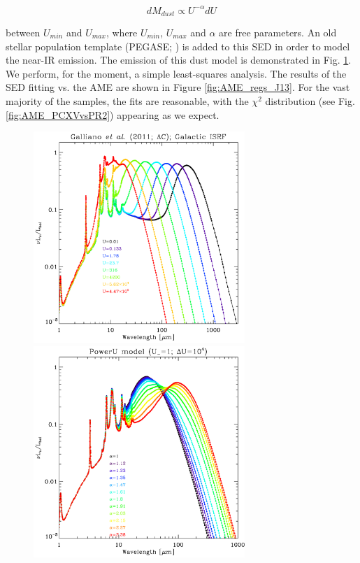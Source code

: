 \documentclass[preprint2,longabstract]{aastex}
\begin{document}
\begin{equation}
    \label{eq:U}
      dM_{dust}\propto{} U^{-\alpha}dU
 \end{equation}

between $U_{min}$ and $U_{max}$, where $U_{min}$, $U_{max}$ and $\alpha{}$ are free parameters. An old stellar population template (PEGASE; \citep{fioc97}) is added to this SED in order to model the near-IR emission. The emission of this dust model is demonstrated in Fig. \ref{fig:galliano11_templates}. We perform, for the moment, a simple least-squares analysis. The results of the SED fitting vs. the AME are shown in Figure \ref{fig:AME_regs_J13}. For the vast majority of the samples, the fits are reasonable, with the $\chi^{2}$ distribution (see Fig. \ref{fig:AME_PCXVvsPR2}) appearing as we expect.

\begin{figure}
\label{fig:galliano11_templates}
\includegraphics[width=80mm]{../Plots/template_deltaU_G11_AC.pdf}
\includegraphics[width=80mm]{../Plots/template_powerU_alpha_G11_AC.pdf}

\end{figure}
\end{document}
